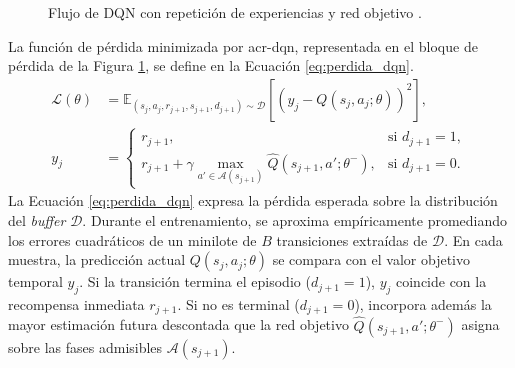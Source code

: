 \begin{figure}[!htbp]
{%
    }
    \caption[Flujo conceptual de DQN con repetición de experiencias y red objetivo]{Flujo de DQN con repetición de experiencias y red objetivo \cite{mnih2015}.}
    \label{fig:arquitectura_dqn}
\end{figure}
\FloatBarrier

\begingroup
{}
La función de pérdida minimizada por \acrshort{acr-dqn}, representada en el bloque de pérdida de la Figura \ref{fig:arquitectura_dqn}, se define en la Ecuación \eqref{eq:perdida_dqn}.
\begin{equation}
\begin{aligned}
\mathcal{L}(\theta) &= \mathbb{E}_{(s_j, a_j, r_{j+1}, s_{j+1}, d_{j+1}) \sim \mathcal{D}}
\left[\left(y_j - Q(s_j, a_j; \theta)\right)^2\right], \\[4pt]
y_j &= \begin{cases}
r_{j+1}, & \text{si } d_{j+1} = 1, \\
r_{j+1} + \gamma \max\limits_{a' \in \mathcal{A}(s_{j+1})} \hat{Q}(s_{j+1}, a'; \theta^{-}), & \text{si } d_{j+1} = 0.
\end{cases}
\end{aligned}
\label{eq:perdida_dqn}
\end{equation}
\endgroup
La Ecuación \eqref{eq:perdida_dqn} expresa la pérdida esperada sobre la distribución del \textit{buffer} $\mathcal{D}$. Durante el entrenamiento, se aproxima empíricamente promediando los errores cuadráticos de un minilote de $B$ transiciones extraídas de $\mathcal{D}$. En cada muestra, la predicción actual $Q(s_j, a_j; \theta)$ se compara con el valor objetivo temporal $y_j$. Si la transición termina el episodio ($d_{j+1}=1$), $y_j$ coincide con la recompensa inmediata $r_{j+1}$. Si no es terminal ($d_{j+1}=0$), incorpora además la mayor estimación futura descontada que la red objetivo $\hat{Q}(s_{j+1}, a'; \theta^-)$ asigna sobre las fases admisibles $\mathcal{A}(s_{j+1})$.


